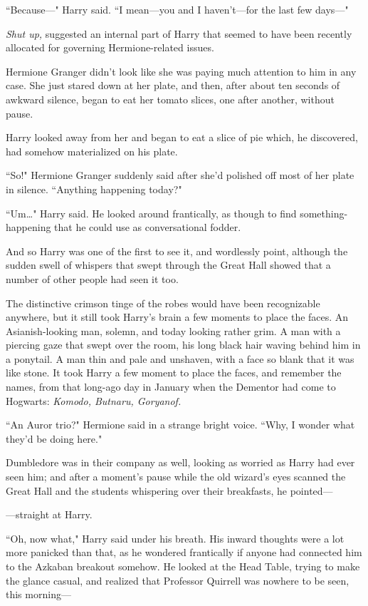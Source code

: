 ``Because—" Harry said. ``I mean—you and I haven't—for the last few days—"

\emph{Shut up,} suggested an internal part of Harry that seemed to have been recently allocated for governing Hermione-related issues.

Hermione Granger didn't look like she was paying much attention to him in any case. She just stared down at her plate, and then, after about ten seconds of awkward silence, began to eat her tomato slices, one after another, without pause.

Harry looked away from her and began to eat a slice of pie which, he discovered, had somehow materialized on his plate.

``So!" Hermione Granger suddenly said after she'd polished off most of her plate in silence. ``Anything happening today?"

``Um…" Harry said. He looked around frantically, as though to find something-happening that he could use as conversational fodder.

And so Harry was one of the first to see it, and wordlessly point, although the sudden swell of whispers that swept through the Great Hall showed that a number of other people had seen it too.

The distinctive crimson tinge of the robes would have been recognizable anywhere, but it still took Harry's brain a few moments to place the faces. An Asianish-looking man, solemn, and today looking rather grim. A man with a piercing gaze that swept over the room, his long black hair waving behind him in a ponytail. A man thin and pale and unshaven, with a face so blank that it was like stone. It took Harry a few moment to place the faces, and remember the names, from that long-ago day in January when the Dementor had come to Hogwarts: \emph{Komodo, Butnaru, Goryanof.}

``An Auror trio?" Hermione said in a strange bright voice. ``Why, I wonder what they'd be doing here."

Dumbledore was in their company as well, looking as worried as Harry had ever seen him; and after a moment's pause while the old wizard's eyes scanned the Great Hall and the students whispering over their breakfasts, he pointed—

—straight at Harry.

``Oh, now what," Harry said under his breath. His inward thoughts were a lot more panicked than that, as he wondered frantically if anyone had connected him to the Azkaban breakout somehow. He looked at the Head Table, trying to make the glance casual, and realized that Professor Quirrell was nowhere to be seen, this morning—


